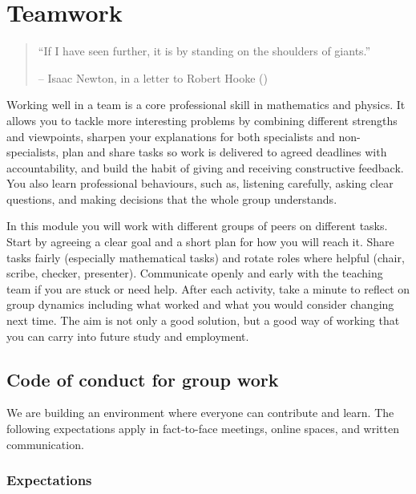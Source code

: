 \documentclass[
  a4paper,
  DIV=11,
  numbers=noendperiod,
  oneside]{scrreprt}
\begin{document}
\chapter{Teamwork}\label{sec-teamwork}

\begin{quote}
``If I have seen further, it is by standing on the shoulders of
giants.''

-- Isaac Newton, in a letter to Robert Hooke
()
\end{quote}

Working well in a team is a core professional skill in mathematics and
physics. It allows you to tackle more interesting problems by combining
different strengths and viewpoints, sharpen your explanations for both
specialists and non-specialists, plan and share tasks so work is
delivered to agreed deadlines with accountability, and build the habit
of giving and receiving constructive feedback. You also learn
professional behaviours, such as, listening carefully, asking clear
questions, and making decisions that the whole group understands.

In this module you will work with different groups of peers on different
tasks. Start by agreeing a clear goal and a short plan for how you will
reach it. Share tasks fairly (especially mathematical tasks) and rotate
roles where helpful (chair, scribe, checker, presenter). Communicate
openly and early with the teaching team if you are stuck or need help.
After each activity, take a minute to reflect on group dynamics
including what worked and what you would consider changing next time.
The aim is not only a good solution, but a good way of working that you
can carry into future study and employment.

\section{Code of conduct for group
work}\label{code-of-conduct-for-group-work}

We are building an environment where everyone can contribute and learn.
The following expectations apply in fact-to-face meetings, online
spaces, and written communication.

\subsection*{Expectations}\label{expectations}
\end{document}
